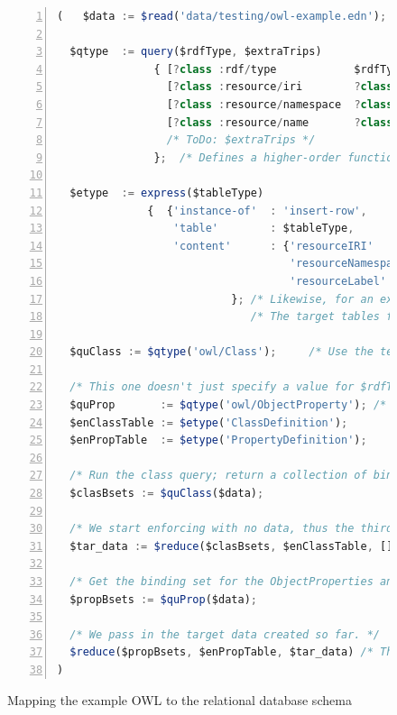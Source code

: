 \documentclass[10pt,letterpaper]{article} %
\begin{document}
\begin{figure}[H]
  \caption{Mapping the example OWL to the relational database schema}
  \label{code:mapping-owl-to-rdbms}
\begin{lstlisting}[language=JavaScript,numberstyle=\scriptsize,basicstyle=\ttfamily\scriptsize,numbers=left,stepnumber=1,breaklines=true]
  (   $data := $read('data/testing/owl-example.edn');

  $qtype  := query($rdfType, $extraTrips)
               { [?class :rdf/type            $rdfType]
                 [?class :resource/iri        ?class-iri]
                 [?class :resource/namespace  ?class-ns]
                 [?class :resource/name       ?class-name]
                 /* ToDo: $extraTrips */
               };  /* Defines a higher-order function, a template of sorts. */

  $etype  := express($tableType)
              {  {'instance-of'  : 'insert-row',
                  'table'        : $tableType,
                  'content'      : {'resourceIRI'       : ?class-iri,
                                    'resourceNamespace' : ?class-ns,
                                    'resourceLabel'     : ?class-name}}
                           }; /* Likewise, for an express template. */
                              /* The target tables for objects and relations a very similar. */

  $quClass := $qtype('owl/Class');     /* Use the template, here and the next three assignments. */

  /* This one doesn't just specify a value for $rdfType, but for $extraTrips. */
  $quProp       := $qtype('owl/ObjectProperty'); /* ToDo: ,queryTriples{[?class :rdfs/domain ?domain] [?class :rdfs/range ?range]}); */
  $enClassTable := $etype('ClassDefinition');
  $enPropTable  := $etype('PropertyDefinition');

  /* Run the class query; return a collection of binding objects about classes. */
  $clasBsets := $quClass($data);

  /* We start enforcing with no data, thus the third argument is []. */
  $tar_data := $reduce($clasBsets, $enClassTable, []);

  /* Get the binding set for the ObjectProperties and make similar tables. */
  $propBsets := $quProp($data);

  /* We pass in the target data created so far. */
  $reduce($propBsets, $enPropTable, $tar_data) /* The code block returns the target data. */
)
\end{lstlisting}
\end{figure} \vspace{-3em}
\end{document}
